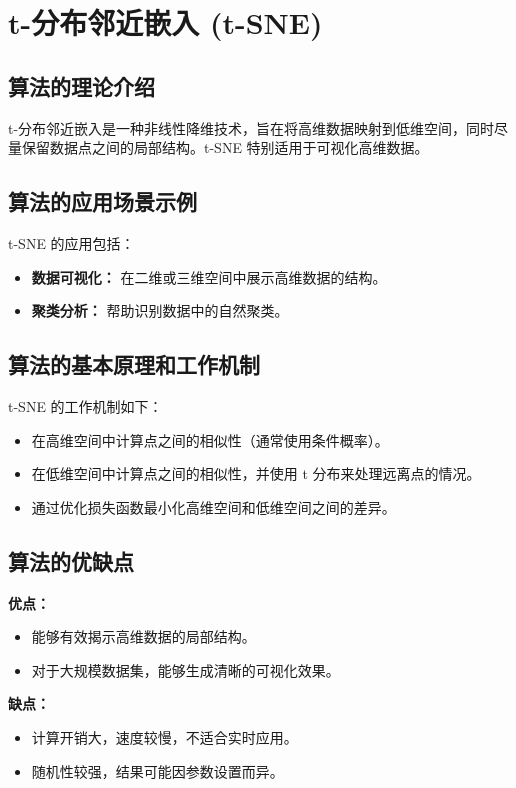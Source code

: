 \section{t-分布邻近嵌入 (t-SNE)}
\subsection*{算法的理论介绍}
t-分布邻近嵌入是一种非线性降维技术，旨在将高维数据映射到低维空间，同时尽量保留数据点之间的局部结构。t-SNE 特别适用于可视化高维数据。

\subsection*{算法的应用场景示例}
t-SNE 的应用包括：
\begin{itemize}
    \item \textbf{数据可视化：} 在二维或三维空间中展示高维数据的结构。
    \item \textbf{聚类分析：} 帮助识别数据中的自然聚类。
\end{itemize}

\subsection*{算法的基本原理和工作机制}
t-SNE 的工作机制如下：
\begin{itemize}
    \item 在高维空间中计算点之间的相似性（通常使用条件概率）。
    \item 在低维空间中计算点之间的相似性，并使用 t 分布来处理远离点的情况。
    \item 通过优化损失函数最小化高维空间和低维空间之间的差异。
\end{itemize}

\subsection*{算法的优缺点}
\textbf{优点：}
\begin{itemize}
    \item 能够有效揭示高维数据的局部结构。
    \item 对于大规模数据集，能够生成清晰的可视化效果。
\end{itemize}

\textbf{缺点：}
\begin{itemize}
    \item 计算开销大，速度较慢，不适合实时应用。
    \item 随机性较强，结果可能因参数设置而异。
\end{itemize}

